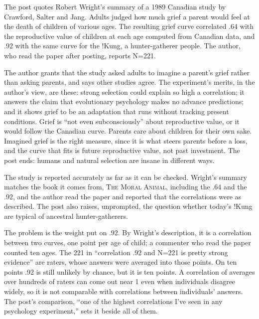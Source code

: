 \begin{afterword}
\summaryhead

The post quotes Robert Wright's summary of a 1989 Canadian study by Crawford, Salter and Jang. Adults judged how much grief a parent would feel at the death of children of various ages. The resulting grief curve correlated .64 with the reproductive value of children at each age computed from Canadian data, and .92 with the same curve for the !Kung, a hunter-gatherer people. The author, who read the paper after posting, reports N=221.

The author grants that the study asked adults to imagine a parent's grief rather than asking parents, and says other studies agree. The experiment's merits, in the author's view, are these: strong selection could explain so high a correlation; it answers the claim that evolutionary psychology makes no advance predictions; and it shows grief to be an adaptation that runs without tracking present conditions. Grief is ``not even subconsciously'' about reproductive value, or it would follow the Canadian curve. Parents care about children for their own sake. Imagined grief is the right measure, since it is what steers parents before a loss, and the curve that fits is future reproductive value, not past investment. The post ends: humans and natural selection are insane in different ways.

\responsehead

The study is reported accurately as far as it can be checked. Wright's summary matches the book it comes from, \textsc{The Moral Animal}, including the .64 and the .92, and the author read the paper and reported that the correlations were as described. The post also raises, unprompted, the question whether today's !Kung are typical of ancestral hunter-gatherers.

The problem is the weight put on .92. By Wright's description, it is a correlation between two curves, one point per age of child; a commenter who read the paper counted ten ages. The 221 in ``correlation .92 and N=221 is pretty strong evidence'' are raters, whose answers were averaged into those points. On ten points .92 is still unlikely by chance, but it is ten points. A correlation of averages over hundreds of raters can come out near 1 even when individuals disagree widely, so it is not comparable with correlations between individuals' answers. The post's comparison, ``one of the highest correlations I've seen in any psychology experiment,'' sets it beside all of them.


\end{afterword}
